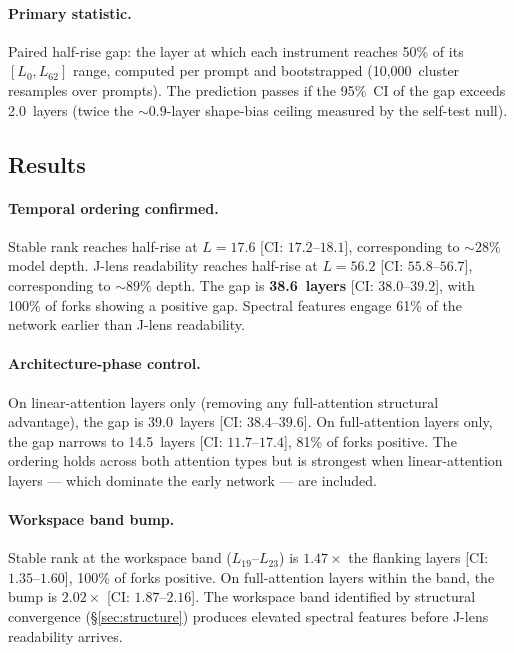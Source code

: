 \documentclass[11pt,a4paper]{article}
\begin{document}
\paragraph{Primary statistic.} Paired half-rise gap: the layer at which
each instrument reaches 50\% of its $[L_0, L_{62}]$ range, computed per
prompt and bootstrapped (10{,}000~cluster resamples over prompts). The
prediction passes if the 95\%~CI of the gap exceeds 2.0~layers (twice
the ${\sim}0.9$-layer shape-bias ceiling measured by the self-test null).

\subsection{Results}

\paragraph{Temporal ordering confirmed.} Stable rank reaches half-rise
at $L{=}17.6$ [CI: $17.2$--$18.1$], corresponding to ${\sim}28\%$
model depth. J-lens readability reaches half-rise at $L{=}56.2$
[CI: $55.8$--$56.7$], corresponding to ${\sim}89\%$ depth. The gap is
\textbf{38.6~layers} [CI: $38.0$--$39.2$], with 100\% of forks showing
a positive gap. Spectral features engage 61\% of the network earlier
than J-lens readability.

\paragraph{Architecture-phase control.} On linear-attention layers only
(removing any full-attention structural advantage), the gap is
39.0~layers [CI: $38.4$--$39.6$]. On full-attention layers only, the
gap narrows to 14.5~layers [CI: $11.7$--$17.4$], 81\% of forks
positive. The ordering holds across both attention types but is
strongest when linear-attention layers --- which dominate the early
network --- are included.

\paragraph{Workspace band bump.} Stable rank at the workspace band
($L_{19}$--$L_{23}$) is $1.47\times$ the flanking layers
[CI: $1.35$--$1.60$], 100\% of forks positive. On full-attention layers
within the band, the bump is $2.02\times$ [CI: $1.87$--$2.16$]. The
workspace band identified by structural convergence
(\S\ref{sec:structure}) produces elevated spectral features before
J-lens readability arrives.
\end{document}
